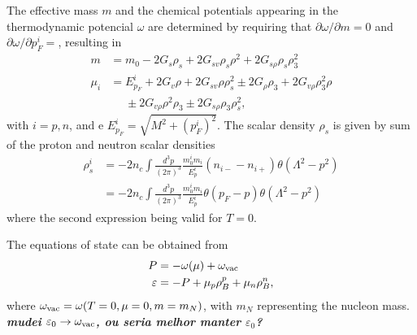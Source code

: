 \documentclass[prc, reprint, amsmath, linenumbers,10pt]{revtex4-1}
\newcommand{\comment}[1]{{\bf\textit{#1}}}
\begin{document}
The effective mass $m$ and the chemical potentials appearing in the thermodynamic potencial $\omega$ are determined by requiring that $\partial\omega/\partial m = 0$ and $\partial\omega/\partial p_F^i = $, resulting in
\begin{align}\label{Eq:Gap}
	m &= m_0 - 2G_s\rho_s + 2G_{sv}\rho_s\rho^2 + 2 G_{s\rho}\rho_s\rho_3^2 \\
	\mu_i &= E_{p_F}^i + 2G_v\rho + 2G_{sv}\rho\rho_s^2 \pm 2G_\rho\rho_3+2G_{v\rho}\rho_3^2\rho \nonumber \\
	&\phantom{=} \pm 2G_{v\rho}\rho^2\rho_3 \pm 2 G_{s\rho}\rho_3\rho_s^2,
\end{align}
%
with $i = p,n$, and e $E_{p_F}^i = \sqrt{M^2 + (p_F^i)^2}$. The scalar density $\rho_s$ is given by sum of the proton and neutron scalar densities
\begin{align}
	\rho_s^i &= - 2 n_c \int \frac{d^3p}{(2\pi)^3}\frac{m_0^i m_i}{E_p^i}(n_{i-} - n_{i+})\theta(\Lambda^2 - p^2) \\
	&= - 2 n_c \int \frac{d^3p}{(2\pi)^3}\frac{m_0^i m_i}{E_p^i}\theta(p_F - p)\theta(\Lambda^2 - p^2)
\end{align}
%
where the second expression being valid for $T = 0$.

The equations of state can be obtained from
\begin{align}
	P &= -\omega(\mu) + \omega_{\rm{vac}} \\
	\varepsilon &= -P + \mu_p \rho_B^p + \mu_n \rho_B^n,
\end{align}
%
where $\omega_{\rm{vac}} = \omega(T = 0, \mu = 0, m = m_N)$, with $m_N$ representing the nucleon mass. \comment{mudei $\varepsilon_0 \to \omega_{\rm{vac}}$, ou seria melhor manter $\varepsilon_0$?} 
\end{document}

